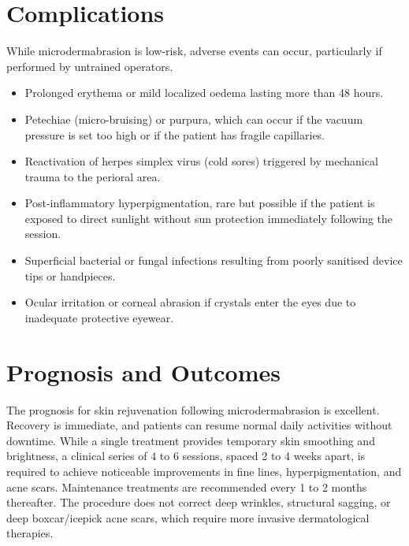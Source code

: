 \section*{Complications}
While microdermabrasion is low-risk, adverse events can occur, particularly if performed by untrained operators.
\begin{itemize}
    \item Prolonged erythema or mild localized oedema lasting more than 48 hours.
    \item Petechiae (micro-bruising) or purpura, which can occur if the vacuum pressure is set too high or if the patient has fragile capillaries.
    \item Reactivation of herpes simplex virus (cold sores) triggered by mechanical trauma to the perioral area.
    \item Post-inflammatory hyperpigmentation, rare but possible if the patient is exposed to direct sunlight without sun protection immediately following the session.
    \item Superficial bacterial or fungal infections resulting from poorly sanitised device tips or handpieces.
    \item Ocular irritation or corneal abrasion if crystals enter the eyes due to inadequate protective eyewear.
\end{itemize}

\section*{Prognosis and Outcomes}
The prognosis for skin rejuvenation following microdermabrasion is excellent. Recovery is immediate, and patients can resume normal daily activities without downtime. While a single treatment provides temporary skin smoothing and brightness, a clinical series of 4 to 6 sessions, spaced 2 to 4 weeks apart, is required to achieve noticeable improvements in fine lines, hyperpigmentation, and acne scars. Maintenance treatments are recommended every 1 to 2 months thereafter. The procedure does not correct deep wrinkles, structural sagging, or deep boxcar/icepick acne scars, which require more invasive dermatological therapies.

